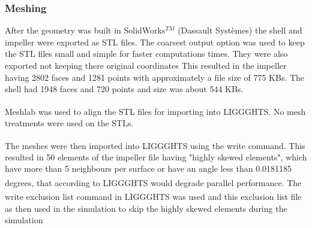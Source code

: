 \documentclass[preprint,11pt,authoryear]{elsarticle}
\begin{document}
	
	    
	
	    \subsubsection{Meshing}
	    \par After the geometry was built in SolidWorks$^{TM}$ (Dassault Syst\`{e}mes) the shell and impeller were exported as STL files. The coarsest output option was used to keep the STL files small and simple for faster computations times. They were also exported not keeping there original coordinates  This resulted in the impeller having 2802 faces and 1281 points with approximately a file size of 775 KBs. The shell had 1948 faces and 720 points and size was about 544 KBs.  
	    \par Meshlab was used to align the STL files for importing into LIGGGHTS\textsuperscript{\textregistered}. No mesh treatments were used on the STLs. 
	    \par The meshes were then imported into LIGGGHTS\textsuperscript{\textregistered} using the write command. This resulted in 50 elements of the impeller file having "highly skewed elements", which have more than 5 neighbours per surface or have an angle less than 0.0181185 degrees, that according to LIGGGHTS\textsuperscript{\textregistered} would degrade parallel performance. The write exclusion list command in LIGGGHTS\textsuperscript{\textregistered} was used and this exclusion list file as then used in the simulation to skip the highly skewed elements during the simulation 
	    
\end{document}
